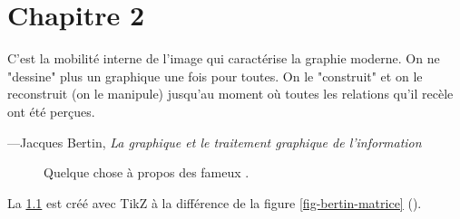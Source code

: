 
\chapter{Chapitre 2}
\label{ch-2}

\epigraph{C'est la mobilité interne de l'image qui caractérise la graphie moderne. On ne "dessine" plus un graphique une fois pour toutes. On le "construit" et on le reconstruit (on le manipule) jusqu'au moment où toutes les relations qu'il recèle ont été perçues.}{---Jacques Bertin, \textit{La graphique et le traitement graphique de l'information}}


\begin{figure}
	\centering
	
	\caption[Singularité.]{Quelque chose à propos des fameux .}
	\label{fig-trou}
\end{figure}

La \cref{fig-trou} est créé avec TikZ à la différence de la figure \ref{fig-bertin-matrice} ().


\lipsum[2-4]

